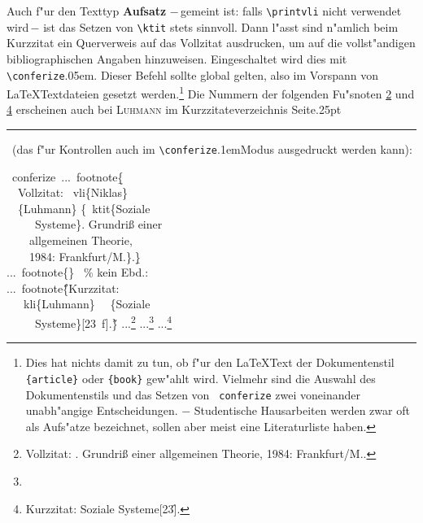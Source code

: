 \documentclass[12pt,a4paper]{article}
\newcommand{\pdfko}[1]{\kern #1pt
                              \rule[-0.4ex]{0.8pt}{0ex}\kern -0.8pt
                          \strut\ignorespaces}%
\newcommand{\pbs}{\string\ \unskip}
\newcommand{\bs}{\protect\pbs}
\begin{document}
\vspace{1ex}\noindent
Auch f"ur den Texttyp \textbf{Aufsatz} $-$\,gemeint ist:
falls \verb|\printvli| nicht verwendet wird\,$-$ ist das Setzen von \hspace{-.1em}\verb|\ktit|
stets sinnvoll. Dann l"asst sind n"amlich beim Kurzzitat ein
Querverweis auf das Vollzitat ausdrucken, um auf die vollst"andigen bibliographischen 
Angaben hinzuweisen. Eingeschaltet wird dies mit \verb|\conferize|\kern.05em. Dieser Befehl 
sollte global gelten, also im Vorspann von
\LaTeX\hy Textdateien gesetzt werden.\footnote{Dies hat nichts
damit zu tun, ob f"ur den \LaTeX\hy Text der Dokumentenstil \texttt{\{article\}}
oder \texttt{\{book\}} gew"ahlt wird. Vielmehr sind die Auswahl des 
Dokumentenstils und das Setzen von \texttt{\bs conferize} zwei voneinander 
unabh"angige Entscheidungen. $-$ Studentische Hausarbeiten werden zwar oft
als Aufs"atze bezeichnet, sollen aber meist eine Literaturliste haben.} 
Die Nummern der folgenden Fu"snoten \ref{vz} und \ref{fz} erscheinen auch bei \textsc{Luhmann} im 
Kurzzitateverzeichnis Seite\nobreak\hspace{.25em}\pageref{vkc}\pdfko{.25}\ 
(das \hspace{.05em}f"ur Kontrollen auch im \verb|\conferize|\kern.1em\hy Modus 
\hspace{.05em}ausgedruckt werden kann):

\vspace{.25ex}
\Doppelbox
{\vspace{1.25ex}
   \bs conferize\ ...\bs footnote\b{\{}
   \\ \ \ Vollzitat: \bs vli\{Niklas\} 
   \\ \ \ \{Luhmann\} \{\bs ktit\{Soziale 
   \\ \ \ \ \ \ Systeme\}. Grundriß einer 
   \\ \ \ \ \ allgemeinen Theorie, 
   \\ \ \ \ \ 1984: Frankfurt/M.\}.\b{\}} 
   \\[1ex] ...\bs footnote\{\} \ \% kein Ebd.:
   \\[.75ex] ...\bs footnote\H{\{}Kurzzitat: 
   \\ \ \ \bs kli\{Luhmann\} \ \ \{Soziale 
   \\ \ \ \ \ \ Systeme\}[23\bs f].\H{\}}
        \vspace{.75ex}
}
{\conferize ...\footnote{\label{vz}%
     Vollzitat:  {. 
     Grundriß einer allgemeinen Theorie, 1984: Frankfurt/M.}.} 
  ...\footnote{}
  ...\footnote{\label{fz}Kurzzitat:  {Soziale Systeme}[23\f].}
}
\end{document}
